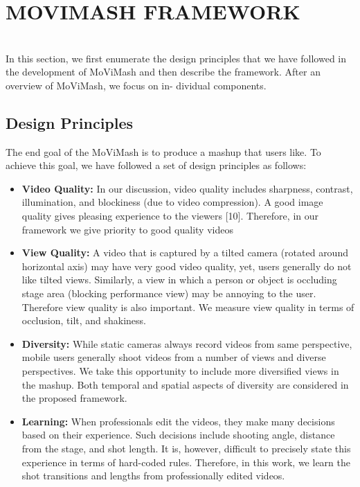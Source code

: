 \documentclass{sig-alternate}
\providecommand{\DIFadd}[1]{{\protect\color{blue}\uwave{#1}}} %
\providecommand{\DIFaddbegin}{} %
\providecommand{\DIFaddend}{} %
\begin{document}
\section{MOVIMASH FRAMEWORK}
\DIFaddbegin \DIFadd{HII MOVIMASH FRAMEWORK}\\

\DIFaddend In this section, we first enumerate the design principles that we
have followed in the development of MoViMash and then describe
the framework. After an overview of MoViMash, we focus on in-
dividual components.



\subsection{Design Principles}
The end goal of the MoViMash is to produce a mashup that users
like. To achieve this goal, we have followed a set of design principles as follows:

\begin{itemize}
\item \textbf{Video Quality:} In our discussion, video quality includes
sharpness, contrast, illumination, and blockiness (due to video
compression). A good image quality gives pleasing experience to the viewers [10]. Therefore, in our framework we
give priority to good quality videos

\item \textbf{View Quality:} A video that is captured by a tilted camera
(rotated around horizontal axis) may have very good video
quality, yet, users generally do not like tilted views. Similarly, a view in which a person or object is occluding stage
area (blocking performance view) may be annoying to the
user. Therefore view quality is also important. We measure
view quality in terms of occlusion, tilt, and shakiness.




\item \textbf{Diversity:} While static cameras always record videos from
same perspective, mobile users generally shoot videos from
a number of views and diverse perspectives. We take this
opportunity to include more diversified views in the mashup.
Both temporal and spatial aspects of diversity are considered
in the proposed framework.

\item \textbf{Learning:} When professionals edit the videos, they make
many decisions based on their experience. Such decisions
include shooting angle, distance from the stage, and shot
length. It is, however, difficult to precisely state this experience in terms of hard-coded rules. Therefore, in this work,
we learn the shot transitions and lengths from professionally
edited videos.

\end{itemize}
\end{document}
